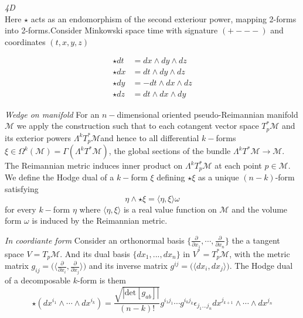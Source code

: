 \documentclass[11pt,a4paper,headinclude=true,DIV=14,BCOR=8mm,chapterprefix,listof=totoc,twoside,openright,abstracton]{scrbook}
\begin{document}
\begin{sidenote}
    \textit{4D}\\
    Here $\star$ acts as an endomorphism of the second exteriour power, mapping 2-forms into 2-forms.Consider Minkowski space time with signature $(+---)$ and coordinates $(t,x,y,z)$
    
    \begin{align}
        \star dt &= dx \wedge dy \wedge dz \\
        \star dx &= dt \wedge dy \wedge dz \\
        \star dy &= -dt \wedge dx \wedge dz \\ 
        \star dz &= dt \wedge dx \wedge dy 
    \end{align}
    
    \textit{Wedge on manifold}
    For an $n-$dimensional oriented pseudo-Reimannian manifold $\mathcal{M}$ we apply the construction such that to each cotangent vector space $T^* _p \mathcal{M}$ and its exterior powers $\Lambda^k T_p ^* \mathcal{M}$and hence to all differential $k-$forms $\xi\in\Omega^k(\mathcal{M})=\Gamma(\Lambda^k T^* \mathcal{M})$, the global sections of the bundle $\Lambda^k T^*\mathcal{M}\rightarrow \mathcal{M}$. The Reimannian metric induces inner product on $\Lambda^k T_p ^* \mathcal{M}$ at each point $p\in\mathcal{M}$. We define the Hodge dual of a $k-$form $\xi$ defining $\star\xi$ as a unique $(n-k)$-form satisfying
    \begin{equation}
        \eta\wedge\star\xi = \langle\eta,\xi\rangle\omega
    \end{equation}
    for every $k-$form $\eta$ where $\langle\eta,\xi\rangle$ is a real value function on $\mathcal{M}$ and the volume form $\omega$ is induced by the Reimannian metric.
    
    \textit{In coordiante form}
    Consider an orthonormal basis $\{ \frac{\partial}{\partial x_1}, \cdots,\frac{\partial}{\partial x_n} \}$ the a tangent space $V=T_p\mathcal{M}$. And its dual basis $\{ dx_1, ..., dx_n \}$ in $V^* = T_p ^*\mathcal{M}$, with the metric matrix $g_{ij} = \big(\langle\frac{\partial}{\partial x_i},\frac{\partial}{\partial x_j}\rangle\big)$ and its inverse matrix $g^{ij} = \big(\langle dx_i, dx_j \rangle\big)$. The Hodge dual of a decomposable $k$-form is them 
    \begin{equation}
        \star(dx^{i_1}\wedge\cdots\wedge dx^{i_k}) = \frac{\sqrt{|\text{det}[g_{ab}]|}}{(n-k)!}g^{i_1 j_1}\cdots g^{i_k j_k} \epsilon_{j_1 ... j_n} dx^{j_{k+1}}\wedge\cdots\wedge dx^{j_n}
    \end{equation}
    
\end{sidenote}
\end{document}
